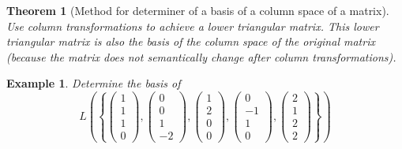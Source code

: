 \documentclass[a4paper,landscape,twocolumn]{article}
\newcommand\set[1]{\left\{#1\right\}}
\newtheorem{theorem}{Theorem}
\newtheorem{ex}{Example}
\begin{document}
\begin{theorem}[Method for determiner of a basis of a column space of a matrix]
  Use column transformations to achieve a lower triangular matrix.
  This lower triangular matrix is also the basis of the column space of the original matrix
  (because the matrix does not semantically change after column transformations).
\end{theorem}
\begin{ex}
  \label{beispiel-6.41}
  Determine the basis of
  \[
    L\left(\set{
      \begin{pmatrix} 1 \\ 1 \\ 1 \\ 0 \end{pmatrix},
      \begin{pmatrix} 0 \\ 0 \\ 1 \\ -2 \end{pmatrix},
      \begin{pmatrix} 1 \\ 2 \\ 0 \\ 0 \end{pmatrix},
      \begin{pmatrix} 0 \\ -1 \\ 1 \\ 0 \end{pmatrix},
      \begin{pmatrix} 2 \\ 1 \\ 2 \\ 2 \end{pmatrix}
    }\right)
  \]


\end{ex}
\end{document}
